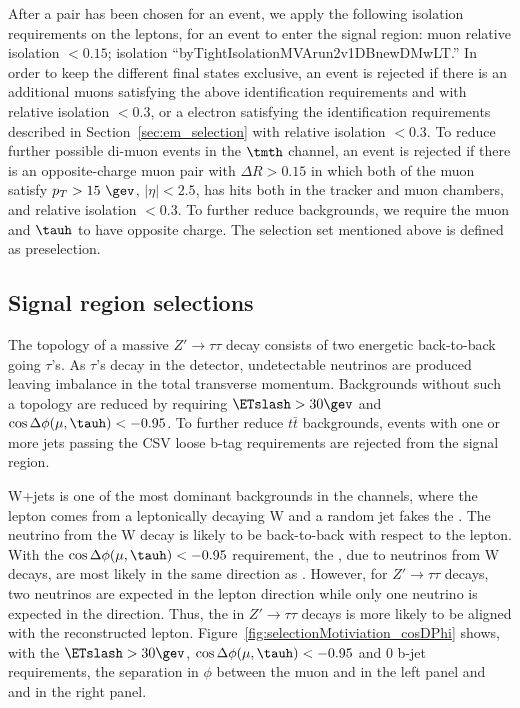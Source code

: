 After a pair has been chosen for an event, we apply the following
isolation requirements on the leptons, for an event to enter the
signal region: muon relative isolation $<0.15$; \tauh isolation
``byTightIsolationMVArun2v1DBnewDMwLT.''  In order to keep the
different final states exclusive, an event is rejected if there is an
additional muons satisfying the above identification requirements
and with relative isolation $<0.3$, or a electron satisfying the
identification requirements described in
Section~\ref{sec:em_selection} with relative isolation $<0.3$.  To
reduce further possible di-muon events in the $\tmth$ channel, an
event is rejected if there is an opposite-charge muon pair with
$\Delta R > 0.15$ in which both of the muon satisfy $p_T >
15~\gev$, $\vert \eta \vert < 2.5$, has hits both in the tracker and muon chambers,
and relative isolation $<0.3$. To further reduce backgrounds, we require 
the muon and $\tauh$ to have opposite charge. The selection set 
mentioned above is defined as preselection.

\subsection{Signal region selections}\label{sec:signalRegionSelection}
The topology of a massive $Z'\to\tau\tau$ decay 
consists of two energetic back-to-back going $\tau$'s. As $\tau$'s 
decay in the detector, undetectable neutrinos are produced leaving 
imbalance in the total transverse momentum. Backgrounds without 
such a topology are reduced by requiring $\ETslash>30 \gev$ and 
$\cos{\Delta \phi (\mu,\tauh)}<-0.95$. To further reduce $t\bar{t}$ 
backgrounds, events with one or more jets passing the CSV loose 
b-tag requirements are rejected from the signal region.

W+jets is one of the most dominant backgrounds in the \ltau channels, 
where the lepton comes from a leptonically decaying W and a 
random jet fakes the \tauh. The neutrino from the W decay is likely 
to be back-to-back with respect to the lepton. With the 
$\cos{\Delta \phi (\mu,\tauh)}<-0.95$ requirement, the \ETslash, 
due to neutrinos from W decays, are most likely in the same 
direction as \tauh. However, for $Z'\to\tau\tau$ decays, two 
neutrinos are expected in the lepton direction while only one 
neutrino is expected in the \tauh direction. Thus, the \ETslash 
in $Z'\to\tau\tau$ decays is more likely to be aligned with the 
reconstructed lepton. Figure~\ref{fig:selectionMotiviation_cosDPhi} 
shows, with the $\ETslash>30 \gev$, $\cos{\Delta \phi (\mu,\tauh)}<-0.95$ 
and 0 b-jet requirements, the separation in $\phi$ between the muon 
and \ETslash in the left panel and \tauh and \ETslash in the right panel.

